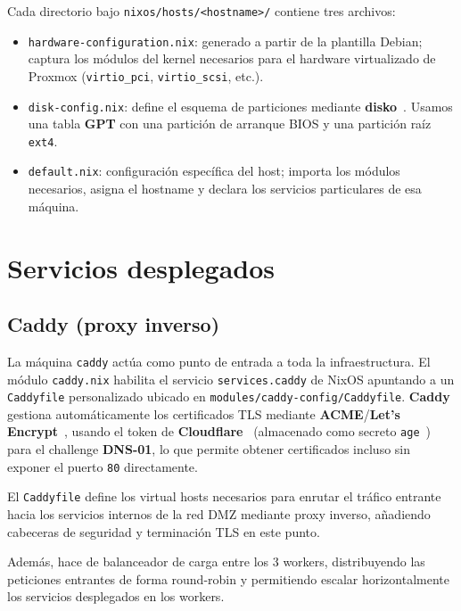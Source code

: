 \documentclass[a4paper, 11pt]{article}
\begin{document}
Cada directorio bajo \texttt{nixos/hosts/<hostname>/} contiene tres archivos:

\begin{itemize}
  \item \texttt{hardware-configuration.nix}: generado a partir de la plantilla Debian; 
    captura los módulos del kernel necesarios para el hardware virtualizado de Proxmox (\texttt{virtio\_pci}, \texttt{virtio\_scsi}, etc.).
  \item \texttt{disk-config.nix}: define el esquema de particiones mediante \textbf{disko}~\cite{disko}. Usamos una tabla \textbf{GPT} con una partición de arranque BIOS y una partición raíz \texttt{ext4}.
  \item \texttt{default.nix}: configuración específica del host; importa los módulos necesarios, asigna el hostname y declara los servicios particulares de esa máquina.
\end{itemize}

\section{Servicios desplegados}

\subsection{Caddy (proxy inverso)}

La máquina \texttt{caddy} actúa como punto de entrada a toda la infraestructura. 
El módulo \texttt{caddy.nix} habilita el servicio \texttt{services.caddy} de NixOS apuntando a un \texttt{Caddyfile} 
personalizado ubicado en \texttt{modules/caddy-config/Caddyfile}. \textbf{Caddy}~\cite{caddy} gestiona automáticamente
los certificados TLS mediante \textbf{ACME}/\textbf{Let's Encrypt}~\cite{letsencrypt}, usando el token de \textbf{Cloudflare}~\cite{cloudflare}
(almacenado como secreto \texttt{age}~\cite{age}) para el challenge \textbf{DNS-01}, 
lo que permite obtener certificados incluso sin exponer el puerto \texttt{80} directamente.

El \texttt{Caddyfile} define los virtual hosts necesarios para enrutar el tráfico entrante hacia
los servicios internos de la red DMZ mediante proxy inverso, añadiendo cabeceras de seguridad y terminación TLS en este punto.

Además, hace de balanceador de carga entre los 3 workers, distribuyendo las peticiones entrantes de forma round-robin y permitiendo 
escalar horizontalmente los servicios desplegados en los workers.
\end{document}
